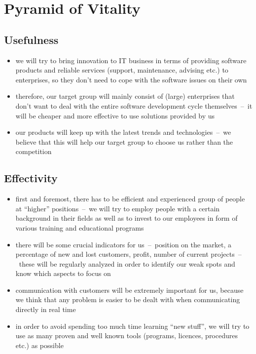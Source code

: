 \documentclass[11pt,a4paper]{article}
\begin{document}
\setlength{\parskip}{0pt}
    \hypersetup{hidelinks}\tableofcontents
\setlength{\parskip}{0pt}


\newpage

\section{Pyramid of Vitality}

    \subsection{Usefulness}
    \begin{itemize}
        \item we will try to bring innovation to IT business in terms of providing software products and reliable services (support, maintenance, advising etc.) to enterprises, so they don’t need to cope with the software issues on their own

        \item therefore, our target group will mainly consist of (large) enterprises that don’t want to deal with the entire software development cycle themselves~--~it will be cheaper and more effective to use solutions provided by us

        \item our products will keep up with the latest trends and technologies~--~we believe that this will help our target group to choose us rather than the competition
    \end{itemize}

    \subsection{Effectivity}
    \begin{itemize}
        \item first and foremost, there has to be efficient and experienced group of people at “higher” positions~--~we will try to employ people with a certain background in their fields as well as to invest to our employees in form of various training and educational programs

        \item there will be some crucial indicators for us~--~position on the market, a percentage of new and lost customers, profit, number of current projects~--~these will be regularly analyzed in order to identify our weak spots and know which aspects to focus on

        \item communication with customers will be extremely important for us, because we think that any problem is easier to be dealt with when communicating directly in real time

        \item in order to avoid spending too much time learning “new stuff”, we will try to use as many proven and well known tools (programs, licences, procedures etc.) as possible
    \end{itemize}
\end{document}

